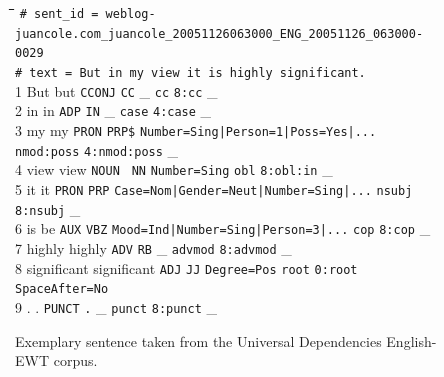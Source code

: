 \vspace*{1mm}
\begin{figure}[h]
\scriptsize
\begin{tabbing}
\hspace*{0.5cm}\=\hspace*{1.5cm}\=\hspace*{1.5cm}\=\hspace*{1.5cm}\=\hspace*{1cm}\=\hspace*{5cm}\=\hspace*{0.75cm}\=\hspace*{1.5cm}\=\hspace*{2cm}\=\hspace*{2cm}\=\kill
\texttt{\# sent\_id = weblog-juancole.com\_juancole\_20051126063000\_ENG\_20051126\_063000-0029} 	\\[1mm]
\texttt{\# text = But in my view it is highly significant.} 													\\[2mm]
1	\>	But			\>	but			\>	\texttt{CCONJ}	\>	\texttt{CC}		\>	\_																\> 	\texttt{cc}			\>	\texttt{8:cc}				\>	\_ 						\\[1mm]
2	\>	in 			\>	in			\>	\texttt{ADP} 		\>	\texttt{IN} 		\>	\_													\>	4			\>	\texttt{case}			\>	\texttt{4:case}			\>	\_ 						\\[1mm]
3	\>	my			\>	my			\>	\texttt{PRON}	\>	\texttt{PRP\$}	\>	\texttt{Number=Sing|Person=1|Poss=Yes|...}						\>	\texttt{nmod:poss}	\>	\texttt{4:nmod:poss}		\>	\_ 						\\[1mm]
4	\>	view		\>	view 		\>	\texttt{NOUN	}	\>	\texttt{NN}		\>	\texttt{Number=Sing}												\> 	\texttt{obl}			\>	\texttt{8:obl:in}			\>	\_ 						\\[1mm]
5	\>	it 			\>	it			\> 	\texttt{PRON}	\>	\texttt{PRP}		\> 	\texttt{Case=Nom|Gender=Neut|Number=Sing|...}					\>	\texttt{nsubj}		\>	\texttt{8:nsubj}			\>	\_ 						\\[1mm]
6	\>	is			\>	be			\> 	\texttt{AUX} 		\>	\texttt{VBZ}		\>	\texttt{Mood=Ind|Number=Sing|Person=3|...}						\>	\texttt{cop}			\>	\texttt{8:cop}			\>	\_ 						\\[1mm]
7	\>	highly		\>	highly		\> 	\texttt{ADV}		\>	\texttt{RB}		\>	\_																\>	\texttt{advmod}		\>	\texttt{8:advmod}		\>	\_ 						\\[1mm]
8	\>	significant 	\>	significant	\> 	\texttt{ADJ}		\>	\texttt{JJ}		\>	\texttt{Degree=Pos}												\>	\texttt{root}			\>	\texttt{0:root	}			\>	\texttt{SpaceAfter=No}	\\[1mm]
9	\>	.			\>	.			\> 	\texttt{PUNCT}	\>	\texttt{.}			\>	\_													\>	8			\>	\texttt{punct}		\>	\texttt{8:punct}			\>	\_						\\[2mm]
	\>		\>		\>			\>			\>												\>	 	\> 	\ding{188}			\>	\ding{189}				\>	
\end{tabbing}
\vspace*{-5mm}
\caption[Exemplary sentence taken from the Universal Dependencies English-EWT corpus]
	{Exemplary sentence taken from the Universal Dependencies English-EWT corpus.}
\label{fig:ud_example}
\end{figure}

